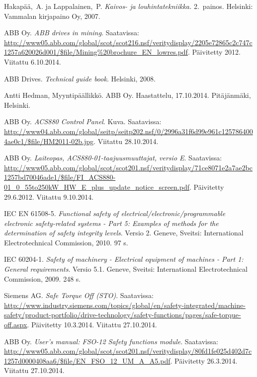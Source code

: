 \documentclass[finnish,12pt,a4paper,pdftex,elec,utf8]{aaltothesis}
\begin{document}
\thesisbibliography
\begin{thebibliography}{99}

Hakapää,\ A. ja Lappalainen,\ P. \textit{Kaivos- ja louhintatekniikka.} 2.\ painos. Helsinki: Vammalan kirjapaino Oy, 2007.

ABB Oy. \textit{ABB drives in mining}. Saatavissa: \url{http://www05.abb.com/global/scot/scot216.nsf/veritydisplay/2205e72865c2c747c1257a620026d001/$file/Mining%20brochure_EN_lowres.pdf}. Päivitetty 2012. Viitattu 6.10.2014.

ABB Drives. \textit{Technical guide book}. Helsinki, 2008.

Antti Hedman, Myyntipäällikkö. ABB Oy. Haastattelu, 17.10.2014. Pitäjänmäki, Helsinki.

ABB Oy. \textit{ACS880 Control Panel}. Kuva. Saatavissa: \url{http://www04.abb.com/global/seitp/seitp202.nsf/0/2996a31f6d99e961c1257864004ae0c1/$file/HM2011-02b.jpg}. Viitattu 28.10.2014.

ABB Oy. \textit{Laiteopas, ACS880-01-taajuusmuuttajat, versio E}. Saatavissa: \url{http://www05.abb.com/global/scot/scot201.nsf/veritydisplay/71ce8071e2a7ae2bc1257bd70046ade1/$file/FI_ACS880-01_0_55to250kW_HW_E_plus_update_notice_screen.pdf}. Päivitetty 29.6.2012. Viitattu 9.10.2014.

IEC EN 61508-5. \textit{Functional safety of electrical/electronic/programmable electronic safety-related systems - Part 5: Examples of methods for the determination of safety integrity levels}. Versio 2. Geneve, Sveitsi: International Electrotechnical Commission, 2010. 97 s.

IEC 60204-1. \textit{Safety of machinery - Electrical equipment of machines - Part 1: General requirements}. Versio 5.1. Geneve, Sveitsi: International Electrotechnical Commission, 2009. 248 s.

Siemens AG. \textit{Safe Torque Off (STO)}. Saatavissa: \url{http://www.industry.siemens.com/topics/global/en/safety-integrated/machine-safety/product-portfolio/drive-technology/safety-functions/pages/safe-torque-off.aspx}. Päivitetty 10.3.2014. Viitattu 27.10.2014.

 ABB Oy. \textit{User's manual: FSO-12 Safety functions module}. Saatavissa: \url{http://www05.abb.com/global/scot/scot201.nsf/veritydisplay/80fd1fe025d402d7c1257d0000408aa6/$file/EN_FSO_12_UM_A_A5.pdf}. Päivitetty 26.3.2014. Viitattu 27.10.2014.


\end{thebibliography}
\end{document}
